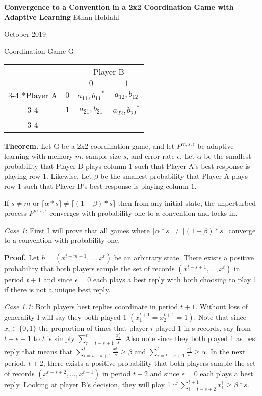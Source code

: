 \documentclass{article}
\begin{document}
\centering
\Large
\textbf{Convergence to a Convention in a 2x2 Coordination Game with Adaptive Learning}
\vskip0pt
Ethan Holdahl

October 2019

\vskip24pt

\centering
Coordination Game G
\vskip6pt
    \begin{tabular}{cc|c|c|}
      & \multicolumn{1}{c}{} & \multicolumn{2}{c}{Player B}\\
      & \multicolumn{1}{c}{} & \multicolumn{1}{c}{$0$}  & \multicolumn{1}{c}{$1$} \\\cline{3-4}
      \multirow{2}*{Player A}  & $0$ & ${a_{11},b_{11}}^*$ & $a_{12},b_{12}$ \\\cline{3-4}
      & $1$ & $a_{21},b_{21}$ & ${a_{22},b_{22}}^*$ \\\cline{3-4}
    \end{tabular}

\vskip24pt

\raggedright

\textbf{Theorem.} Let G be a 2x2 coordination game, and let $P^{m,s,\epsilon}$ be adaptive learning with memory $m$, sample size $s$, and error rate $\epsilon$. Let $\alpha$ be the smallest probability that Player B plays column $1$ such that Player A's best response is playing row $1$. Likewise, Let $\beta$ be the smallest probability that Player A plays row $1$ such that Player B's best response is playing column $1$.

\vskip12pt
If $s \neq m$ or $\lceil \alpha*s \rceil \neq \lceil (1-\beta)*s \rceil$ then from any initial state, the unperturbed process $P^{m,s,\epsilon}$ converges with probability one to a convention and locks in.

\vskip16pt

\textit{Case 1}: First I will prove that all games where $\lceil \alpha*s \rceil \neq \lceil (1-\beta)*s \rceil$ converge to a convention with probability one. 

\textbf{Proof.} Let $h = (x^{t-m+1},...,x^{t})$ be an arbitrary state. There exists a positive probability that both players sample the set of records $(x^{t-s+1},...,x^{t})$ in period $t+1$ and since $\epsilon=0$ each plays a best reply with both choosing to play 1 if there is not a unique best reply.

\vskip16pt

\textit{Case 1.1}: Both players best replies coordinate in period $t+1$. Without loss of generality I will say they both played 1 $(x^{t+1}_1=x^{t+1}_2=1)$. Note that since $x_i \in \{0,1\}$ the proportion of times that player $i$ played $1$ in s records, say from $t-s+1$ to $t$ is simply $\sum\limits_{r=t-s+1}^{t} \frac{x_i^r}{s}$. Also note since they both played 1 as best reply that means that $\sum\limits_{i=t-s+1}^t \frac{x^i_1}{s} \geq \beta$ and $\sum\limits_{i=t-s+1}^t \frac{x^i_2}{s} \geq \alpha$. In the next period, $t+2$, there exists a positive probability that both players sample the set of records $(x^{t-s+2},...,x^{t+1})$ in period $t+2$ and since $\epsilon=0$ each plays a best reply. Looking at player B's decision, they will play 1 if $\sum\limits_{i=t-s+2}^{t+1} x^i_1 \geq \beta*s$.
\end{document}
